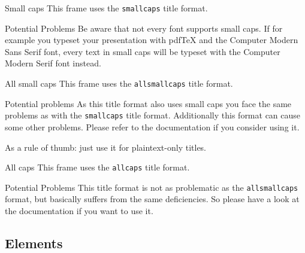 		{
		\begin{frame}{Small caps}
			This frame uses the \texttt{smallcaps} title format.
		
			\begin{alertblock}{Potential Problems}
				Be aware that not every font supports small caps. If for example you typeset your presentation with pdfTeX and the Computer Modern Sans Serif font, every text in small caps will be typeset with the Computer Modern Serif font instead.
			\end{alertblock}
		\end{frame}
		}
		
		{
		\begin{frame}{All small caps}
			This frame uses the \texttt{allsmallcaps} title format.
		
			\begin{alertblock}{Potential problems}
				As this title format also uses small caps you face the same problems as with the \texttt{smallcaps} title format. Additionally this format can cause some other problems. Please refer to the documentation if you consider using it.
		
				As a rule of thumb: just use it for plaintext-only titles.
			\end{alertblock}
		\end{frame}
		}
		
		{
		\begin{frame}{All caps}
			This frame uses the \texttt{allcaps} title format.
		
			\begin{alertblock}{Potential Problems}
				This title format is not as problematic as the \texttt{allsmallcaps} format, but basically suffers from the same deficiencies. So please have a look at the documentation if you want to use it.
			\end{alertblock}
		\end{frame}
		}
		
	\subsection{Elements}

